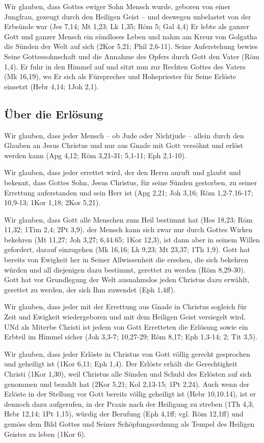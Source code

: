 \documentclass[12pt]{../../inc/mybib}
\begin{document}
Wir glauben, dass Gottes ewiger Sohn Mensch wurde, geboren von einer Jungfrau, gezeugt durch den Heiligen Geist -- und deswegen unbelastet von der Erbsünde war (Jes 7,14; Mt 1,23; Lk 1,35; Röm 5; Gal 4,4) Er lebte als ganzer Gott und ganzer Mensch ein sündloses Leben und nahm am Kreuz von Golgatha die Sünden der Welt auf sich (2Kor 5,21; Phil 2,6-11). Seine Auferstehung bewies Seine Gottessohnschaft und die Annahme des Opfers durch Gott den Vater (Röm 1,4). Er fuhr in den Himmel auf und sitzt nun zur Rechten Gottes des Vaters (Mk 16,19), wo Er sich als Fürsprecher und Hohepriester für Seine Erlöste einsetzt (Hebr 4,14; 1Joh 2,1).
\subsection{Über die Erlösung}
Wir glauben, dass jeder Mensch -- ob Jude oder Nichtjude -- allein durch den Glauben an Jesus Christus und nur aus Gnade mit Gott versöhnt und erlöst werden kann (Apg 4,12; Röm 3,21-31; 5,1-11; Eph 2,1-10).

Wir glauben, dass jeder errettet wird, der den Herrn anruft und glaubt und bekennt, dass Gottes Sohn, Jesus Christus, für seine Sünden gestorben, zu seiner Errettung auferstanden und sein Herr ist (Apg 2,21; Joh 3,16; Röm 1,2-7.16-17; 10,9-13; 1Kor 1,18; 2Kor 5,21).

Wir glauben, dass Gott alle Menschen zum Heil bestimmt hat (Hes 18,23; Röm 11,32; 1Tim 2,4; 2Pt 3,9). der Mensch kann sich zwar nur durch Gottes Wirken bekehren (Mt 11,27; Joh 3,27; 6,44.65; 1Kor 12,3), ist dann aber in seinem Willen gefordert, darauf einzugehen (Mk 16,16; Lk 9,23; Mt 23,37; 1Th 1,9). Gott hat bereits von Ewigkeit her in Seiner Allwissenheit die ersehen, die sich bekehren würden und all diejenigen dazu bestimmt, gerettet zu werden (Röm 8,29-30). Gott hat vor Grundlegung der Welt ausnahmslos jeden Christus dazu erwählt, gerettet zu werden, der sich Ihm zuwendet (Eph 1,4ff).

Wir glauben, dass jeder mit der Errettung aus Gnade in Christus sogleich für Zeit und Ewigkeit wiedergeboren und mit dem Heiligen Geist versiegelt wird. UNd als Miterbe Christi ist jedem von Gott Erretteten die Erlösung sowie ein Erbteil im Himmel sicher (Joh 3,3-7; 10,27-29; Röm 8,17; Eph 1,3-14; 2; Tit 3,5).

Wir glauben, dass jeder Erlöste in Christus von Gott völlig gerecht gesprochen und geheiligt ist (1Kor 6,11; Eph 1,4). Der Erlöste erhält die Gerechtigkeit Christi (1Kor 1,30), weil Christus alle Sünden und Schuld des Erlösten auf sich genommen und bezahlt hat (2Kor 5,21; Kol 2,13-15; 1Pt 2,24). Auch wenn der Erlöste in der Stellung vor Gott bereits völlig geheiligt ist (Hebr 10,10.14), ist er dennoch dazu aufgerufen, in der Praxis nach der Heiligung zu streben (1Th 4,3; Hebr 12,14; 1Pt 1,15), würdig der Berufung (Eph 4,1ff; vgl. Röm 12,1ff) und gemöss dem Bild Gottes und Seiner Schöpfungsordnung als Tempel des Heiligen Geistes zu leben (1Kor 6).
\end{document}
